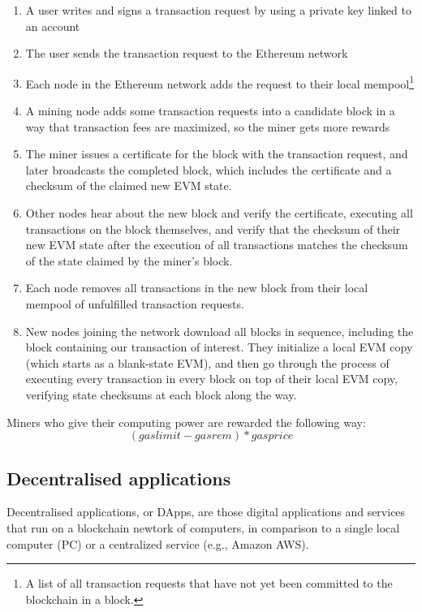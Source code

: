 \documentclass[10pt]{article}
\begin{document}
\begin{multicols}{2}
\begin{enumerate}
	\item A user writes and signs a transaction request by using a private key linked to an account
	\item The user sends the transaction request to the Ethereum network
	\item Each node in the Ethereum network adds the request to their local mempool\footnote{A list of all transaction requests that have not yet been committed to the blockchain in a block.}
	\item A mining node adds some transaction requests into a candidate block in a way that transaction fees are maximized, so the miner gets more rewards
	\item The miner issues a certificate for the block with the transaction request, and later broadcasts the completed block, which includes the certificate and a checksum of the claimed new EVM state.
	\item Other nodes hear about the new block and verify the certificate, executing all transactions on the block themselves, and verify that the checksum of their new EVM state after the execution of all transactions matches the checksum of the state claimed by the miner’s block.
	\item Each node removes all transactions in the new block from their local mempool of unfulfilled transaction requests.
	\item New nodes joining the network download all blocks in sequence, including the block containing our transaction of interest. They initialize a local EVM copy (which starts as a blank-state EVM), and then go through the process of executing every transaction in every block on top of their local EVM copy, verifying state checksums at each block along the way.
\end{enumerate}

Miners who give their computing power are rewarded the following way:
\[ (gaslimit - gasrem) * gasprice \]

\subsection{Decentralised applications}

Decentralised applications, or DApps, are those digital applications and services that run on a blockchain newtork of computers, in comparison to a single local computer (PC) or a centralized service (e.g., Amazon AWS).\\


\end{multicols}
\end{document}
